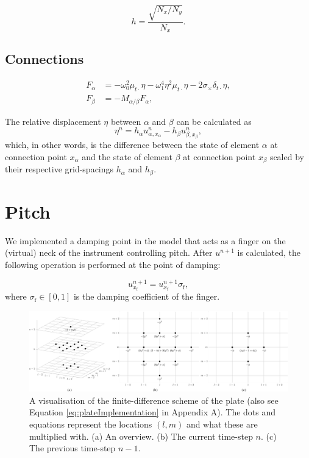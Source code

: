 \documentclass{article}
\begin{document}
\begin{equation}
    h = \frac{\sqrt{N_x / N_y}}{N_x}.
\end{equation}

\subsection{Connections}
\begin{align}
    F_\alpha &= -\omega_0^2\mu_{t\cdot}\eta - \omega_1^4\eta^2\mu_{t\cdot}\eta - 2\sigma_\times\delta_{t\cdot}\eta,\\
    F_\beta &= -M_{\alpha/\beta}F_\alpha,
\end{align}

The relative displacement $\eta$ between $\alpha$ and $\beta$ can be calculated as
\begin{equation}
    \eta^n = h_\alpha u_{\alpha, x_\alpha}^n - h_\beta u_{\beta,x_\beta}^n,
\end{equation}
which, in other words, is the difference between the state of element $\alpha$ at connection point $x_\alpha$ and the state of element $\beta$ at connection point $x_\beta$ scaled by their respective grid-spacings $h_\alpha$ and $h_\beta$.

\section{Pitch}
We implemented a damping point in the model that acts as a finger on the (virtual) neck of the instrument controlling pitch. After $u^{n+1}$ is calculated, the following operation is performed at the point of damping:

\begin{equation}
    u_{x_\text{f}}^{n+1} = u_{x_\text{f}}^{n+1}  \sigma_\text{f},
\end{equation}
where $\sigma_\text{f} \in [0,1]$ is the damping coefficient of the finger. 
\begin{figure}[t]
    \centering
    \includegraphics[width=2.1\columnwidth]{FullPlate}
    \caption{A visualisation of the finite-difference scheme of the plate (also see Equation \eqref{eq:plateImplementation} in Appendix A). The dots and equations represent the locations $(l,m)$ and what these are multiplied with. (a) An overview. (b) The current time-step $n$. (c) The previous time-step $n-1$. \label{fig:plateFDS}}
 \end{figure}
\end{document}

